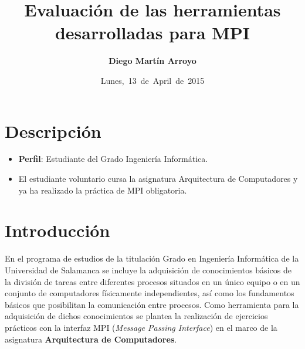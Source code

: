 
\usepackage{xcolor}

\newcommand{\hmwkTitle}{Evaluación de las herramientas desarrolladas para MPI} %
\newcommand{\hmwkDueDate}{Lunes,\ 13\ de\ April\ de\ 2015} %
\newcommand{\hmwkClassInstructor}{Rodrigo Santamaría} %
\newcommand{\hmwkAuthorName}{Diego Martín Arroyo} %
\newcommand{\hmwkSubject}{4} %

\newcommand{\ordinalindicator}{\hspace{-1.5mm}$\phantom{a}^{\circ}$}
\title{\hmwkTitle}
\author{\textbf{\hmwkAuthorName}}
\date{\hmwkDueDate}


\maketitle

\tableofcontents


\section{Descripción}

\begin{itemize}
 	\item \textbf{Perfil}: Estudiante del Grado Ingeniería Informática.
 	\item El estudiante voluntario cursa la asignatura Arquitectura de Computadores y ya ha realizado la práctica de MPI obligatoria.
\end{itemize}


\section{Introducción}

En el programa de estudios de la titulación Grado en Ingeniería Informática de la Universidad de Salamanca se incluye la adquisición de conocimientos básicos de la división de tareas entre diferentes procesos situados en un único equipo o en un conjunto de computadores físicamente independientes, así como los fundamentos básicos que posibilitan la comunicación entre procesos. Como herramienta para la adquisición de dichos conocimientos se plantea la realización de ejercicios prácticos con la interfaz MPI (\textit{Message Passing Interface}) en el marco de la asignatura \textbf{Arquitectura de Computadores}.


